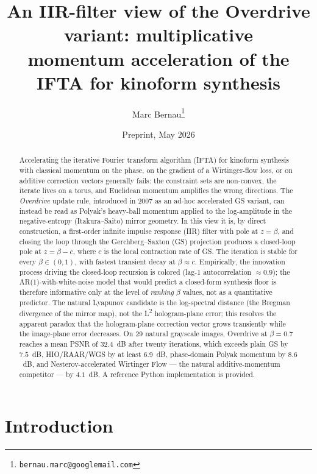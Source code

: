 \documentclass[11pt,a4paper]{article}
\title{An IIR-filter view of the Overdrive variant: multiplicative\\[2pt]
       momentum acceleration of the IFTA for kinoform synthesis}
\author{Marc Bernau\thanks{\texttt{bernau.marc@googlemail.com}}}
\date{Preprint, May 2026}
\begin{document}
\maketitle

\begin{abstract}
Accelerating the iterative Fourier transform algorithm (IFTA) for kinoform
synthesis with classical momentum on the phase, on the gradient of a
Wirtinger-flow loss, or on additive correction vectors generally fails: the
constraint sets are non-convex, the iterate lives on a torus, and
Euclidean momentum amplifies the wrong directions. The \emph{Overdrive}
update rule, introduced in 2007 as an ad-hoc accelerated GS variant, can
instead be read as Polyak's heavy-ball momentum applied to the
log-amplitude in the negative-entropy (Itakura--Saito) mirror geometry.
In this view it is, by direct construction, a first-order infinite impulse
response (IIR) filter with pole at $z=\beta$, and closing the loop through
the Gerchberg--Saxton (GS) projection produces a closed-loop pole at
$z=\beta-c$, where $c$ is the local contraction rate of GS. The iteration
is stable for every $\beta\in(0,1)$, with fastest transient decay at
$\beta\approx c$. Empirically, the innovation process driving the
closed-loop recursion is colored (lag-1 autocorrelation $\approx 0.9$);
the AR(1)-with-white-noise model that would predict a closed-form synthesis
floor is therefore informative only at the level of \emph{ranking} $\beta$
values, not as a quantitative predictor. The natural Lyapunov candidate is
the log-spectral distance (the Bregman divergence of the mirror map), not
the L\textsuperscript{2} hologram-plane error; this resolves the apparent
paradox that the hologram-plane correction vector grows transiently while
the image-plane error decreases. On 29 natural grayscale images, Overdrive
at $\beta=0.7$ reaches a mean PSNR of $32.4$~dB after twenty iterations,
which exceeds plain GS by $7.5$~dB, HIO/RAAR/WGS by at least $6.9$~dB,
phase-domain Polyak momentum by $8.6$~dB, and Nesterov-accelerated Wirtinger
Flow --- the natural additive-momentum competitor --- by $4.1$~dB. A
reference Python implementation is provided.
\end{abstract}

\section{Introduction}
\end{document}
